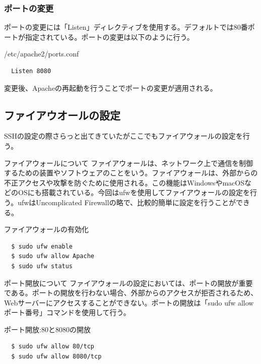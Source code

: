 \documentclass[a4paper, 11pt, dvipdfmx]{jsarticle}
\begin{document}
\subsubsection{ポートの変更}
ポートの変更には「Listen」ディレクティブを使用する。デフォルトでは80番ポートが指定されている。ポートの変更は以下のように行う。
\begin{commandbox}{/etc/apache2/ports.conf}
  \begin{verbatim}
  Listen 8080\end{verbatim}
\end{commandbox}
変更後、Apacheの再起動を行うことでポートの変更が適用される。
\subsection{ファイアウオールの設定}
SSHの設定の際さらっと出てきていたがここでもファイアウォールの設定を行う。
\begin{johobox}{ファイアウォールについて}
  ファイアウォールは、ネットワーク上で通信を制御するための装置やソフトウェアのことをいう。ファイアウォールは、外部からの不正アクセスや攻撃を防ぐために使用される。この機能はWindowsやmacOSなどのOSにも搭載されている。今回はufwを使用してファイアウォールの設定を行う。ufwはUncomplicated Firewallの略で、比較的簡単に設定を行うことができる。
\end{johobox}
\begin{commandbox}{ファイアウォールの有効化}
  \begin{verbatim}
  $ sudo ufw enable
  $ sudo ufw allow Apache
  $ sudo ufw status\end{verbatim}
\end{commandbox}
\begin{hosokubox}{ポート開放について}
  ファイアウォールの設定においては、ポートの開放が重要である。ポートの開放を行わない場合、外部からのアクセスが拒否されるため、Webサーバーにアクセスすることができない。ポートの開放は「sudo ufw allow ポート番号」コマンドを使用して行う。
\end{hosokubox}
\begin{commandbox}{ポート開放:80と8080の開放}
  \begin{verbatim}
  $ sudo ufw allow 80/tcp
  $ sudo ufw allow 8080/tcp\end{verbatim}
\end{commandbox}
\end{document}

